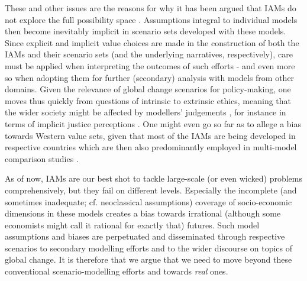 \documentclass{article}
\begin{document}
\begin{refsection}
These and other issues are the reasons for why it has been argued that IAMs do not explore the full possibility space \parencite{keppo_2021,mccollum_2020, gambhir_2022}. Assumptions integral to individual models then become inevitably implicit in scenario sets developed with these models. Since explicit and implicit value choices are made in the construction of both the IAMs and their scenario sets (and the underlying narratives, respectively), care must be applied when interpreting the outcomes of such efforts \parencite[even if it is only reference scenarios; see e.g.][]{grant_2020} - and even more so when adopting them for further (secondary) analysis with models from other domains. Given the relevance of global change scenarios for policy-making, one moves thus quickly from questions of intrinsic to extrinsic ethics, meaning that the wider society might be affected by modellers' judgements \parencite{beck_2016},\footnotemark{} for instance in terms of implicit justice perceptions \parencite{rubiano_2022}. One might even go so far as to allege a bias towards Western value sets, given that most of the IAMs are being developed in respective countries which are then also predominantly employed in multi-model comparison studies \parencite{duan_2019}.


As of now, IAMs are our best shot to tackle large-scale (or even wicked) problems comprehensively, but they fail on different levels. Especially the incomplete (and sometimes inadequate; cf. neoclassical assumptions) coverage of socio-economic dimensions in these models creates a bias towards irrational (although some economists might call it rational for exactly that) futures. Such model assumptions and biases are perpetuated and disseminated through respective scenarios to secondary modelling efforts and to the wider discourse on topics of global change. It is therefore that we argue that we need to move beyond these conventional scenario-modelling efforts and towards \textit{real} ones.

\label{discussion}

\end{refsection}
\end{document}
